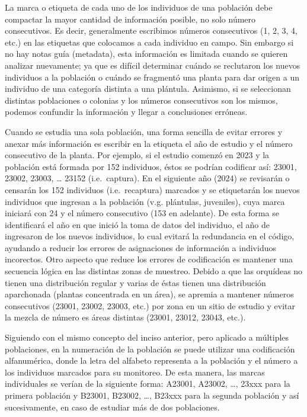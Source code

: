 \documentclass[
]{book}
\theoremstyle{definition}
\theoremstyle{definition}
\theoremstyle{definition}
\theoremstyle{definition}
\theoremstyle{remark}
\begin{document}
La marca o etiqueta de cada uno de los individuos de una población debe compactar la mayor cantidad de información posible, no solo número consecutivos.
Es decir, generalmente escribimos números consecutivos (1, 2, 3, 4, etc.) en las etiquetas que colocamos a cada individuo en campo.
Sin embargo si no hay notas guía (metadata), esta información es limitada cuando se quieren analizar nuevamente; ya que es difícil determinar cuándo se reclutaron los nuevos individuos a la población o cuándo se fragmentó una planta para dar origen a un individuo de una categoría distinta a una plántula.
Asimismo, si se seleccionan distintas poblaciones o colonias y los números consecutivos son los mismos, podemos confundir la información y llegar a conclusiones erróneas.

Cuando se estudia una sola población, una forma sencilla de evitar errores y anexar más información es escribir en la etiqueta el año de estudio y el número consecutivo de la planta.
Por ejemplo, si el estudio comenzó en 2023 y la población está formada por 152 individuos, éstos se podrían codificar así: 23001, 23002, 23003, \ldots{}
23152 (i.e.~captura).
En el siguiente año (2024) se revisarán o censarán los 152 individuos (i.e.~recaptura) marcados y se etiquetarán los nuevos individuos que ingresan a la población (v.g. plántulas, juveniles), cuya marca iniciará con 24 y el número consecutivo (153 en adelante).
De esta forma se identificará el año en que inició la toma de datos del individuo, el año de ingresaron de los nuevos individuos, lo cual evitará la redundancia en el código, ayudando a reducir los errores de asignaciones de información a individuos incorectos.
Otro aspecto que reduce los errores de codificación es mantener una secuencia lógica en las distintas zonas de muestreo.
Debido a que las orquídeas no tienen una distribución regular y varias de éstas tienen una distribución aparchonada (plantas concentrada en un área), se apremia a mantener números consecutivos (23001, 23002, 23003, etc.) por zona en un sitio de estudio y evitar la mezcla de número es áreas distintas (23001, 23012, 23043, etc.).

Siguiendo con el mismo concepto del inciso anterior, pero aplicado a múltiples poblaciones, en la numeración de la población se puede utilizar una codificación alfanumérica, donde la letra del alfabeto representa a la población y el número a los individuos marcados para su monitoreo.
De esta manera, las marcas individuales se verían de la siguiente forma: A23001, A23002, \ldots, 23xxx para la primera población y B23001, B23002, \ldots, B23xxx para la segunda población y así sucesivamente, en caso de estudiar más de dos poblaciones.
\end{document}
